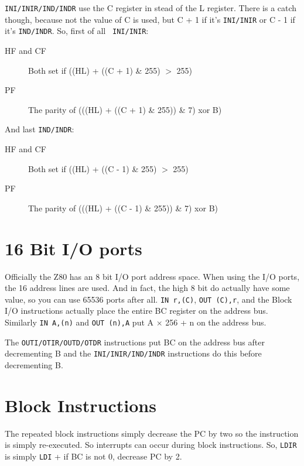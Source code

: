\documentclass[oneside,a4paper]{book}
\begin{document}
{\tt INI/INIR/IND/INDR} use the C register in stead of the L register. There 
is a catch though, because not the value of C is used, but C + 1 if it's
{\tt INI/INIR} or C - 1 if it's {\tt IND/INDR}. So, first of all {\tt 
INI/INIR}:

\begin{description}

\item[HF and CF]
  Both set if ((HL) + ((C + 1) \& 255)  $>$ 255)

\item[PF]
  The parity of (((HL) + ((C + 1) \& 255)) \& 7) xor B)

\end{description}

And last {\tt IND/INDR}:

\begin{description}

\item[HF and CF]
  Both set if ((HL) + ((C - 1) \& 255) $>$ 255)

\item[PF]
  The parity of (((HL) + ((C - 1) \& 255)) \& 7) xor B)

\end{description}

\section{16 Bit I/O ports}

Officially the Z80 has an 8 bit I/O port address space. When using the I/O
ports, the 16 address lines are used. And in fact, the high 8 bit do actually
have some value, so you can use 65536 ports after all. {\tt IN r,(C)},
{\tt OUT (C),r}, and the Block I/O instructions  actually place the entire BC
register on the address bus. Similarly {\tt IN A,(n)} and {\tt OUT (n),A} put
A $\times$ 256 + n on the address bus.

The {\tt OUTI/OTIR/OUTD/OTDR} instructions put BC on the address bus after decrementing B and
the {\tt INI/INIR/IND/INDR} instructions do this before decrementing B.

\section{Block Instructions}

The repeated block instructions simply decrease the PC by two so the 
instruction is simply re-executed. So interrupts can occur during block 
instructions. So, {\tt LDIR} is simply {\tt LDI} + if BC is not 0, decrease 
PC by 2.
\end{document}
